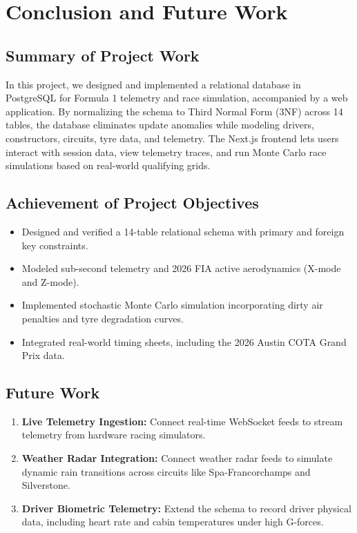 \documentclass[12pt,a4paper]{report}
\begin{document}
\chapter{Conclusion and Future Work}

\section{Summary of Project Work}
In this project, we designed and implemented a relational database in PostgreSQL for Formula 1 telemetry and race simulation, accompanied by a web application. By normalizing the schema to Third Normal Form (3NF) across 14 tables, the database eliminates update anomalies while modeling drivers, constructors, circuits, tyre data, and telemetry. The Next.js frontend lets users interact with session data, view telemetry traces, and run Monte Carlo race simulations based on real-world qualifying grids.

\section{Achievement of Project Objectives}
\begin{itemize}
    \item Designed and verified a 14-table relational schema with primary and foreign key constraints.
    \item Modeled sub-second telemetry and 2026 FIA active aerodynamics (X-mode and Z-mode).
    \item Implemented stochastic Monte Carlo simulation incorporating dirty air penalties and tyre degradation curves.
    \item Integrated real-world timing sheets, including the 2026 Austin COTA Grand Prix data.
\end{itemize}

\section{Future Work}
\begin{enumerate}
    \item \textbf{Live Telemetry Ingestion:} Connect real-time WebSocket feeds to stream telemetry from hardware racing simulators.
    \item \textbf{Weather Radar Integration:} Connect weather radar feeds to simulate dynamic rain transitions across circuits like Spa-Francorchamps and Silverstone.
    \item \textbf{Driver Biometric Telemetry:} Extend the schema to record driver physical data, including heart rate and cabin temperatures under high G-forces.
\end{enumerate}
\end{document}
